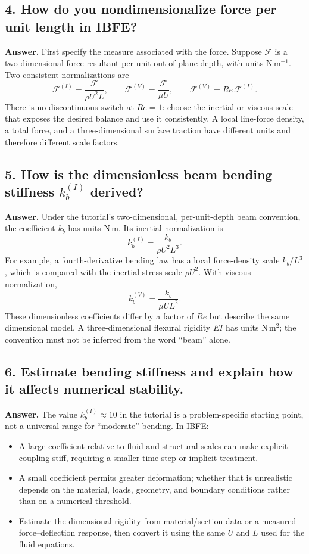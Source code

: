 \documentclass[12pt]{article}
\begin{document}
\subsection*{4. How do you nondimensionalize force per unit length in IBFE?}

\textbf{Answer.}
First specify the measure associated with the force. Suppose $\mathcal{F}$ is a
two-dimensional force resultant per unit out-of-plane depth, with units
$\mathrm{N\,m^{-1}}$. Two consistent normalizations are
\[
\mathcal{F}^{(I)}=\frac{\mathcal{F}}{\rho U^2L},
\qquad
\mathcal{F}^{(V)}=\frac{\mathcal{F}}{\mu U},
\qquad
\mathcal{F}^{(V)}=Re\,\mathcal{F}^{(I)}.
\]
There is no discontinuous switch at $Re=1$: choose the inertial or viscous scale
that exposes the desired balance and use it consistently. A local line-force
density, a total force, and a three-dimensional surface traction have different
units and therefore different scale factors.

\subsection*{5. How is the dimensionless beam bending stiffness $k_b^{(I)}$ derived?}

\textbf{Answer.}
Under the tutorial's two-dimensional, per-unit-depth beam convention, the
coefficient $k_b$ has units $\mathrm{N\,m}$. Its inertial
normalization is
\[
k_b^{(I)}=\frac{k_b}{\rho U^2 L^3}.
\]
For example, a fourth-derivative bending law has a local force-density scale
$k_b/L^3$, which is compared with the inertial stress scale
$\rho U^2$. With viscous normalization,
\[
k_b^{(V)}=\frac{k_b}{\mu U L^2}.
\]
These dimensionless coefficients differ by a factor of $Re$ but describe the
same dimensional model. A three-dimensional flexural rigidity $EI$ has units
$\mathrm{N\,m^2}$; the convention must not be inferred from the word ``beam''
alone.

\subsection*{6. Estimate bending stiffness and explain how it affects numerical stability.}

\textbf{Answer.}
The value $k_b^{(I)}\approx 10$ in the tutorial is a problem-specific
starting point, not a universal range for ``moderate'' bending. In IBFE:
\begin{itemize}
    \item A large coefficient relative to fluid and structural scales can make
          explicit coupling stiff, requiring a smaller time step or implicit
          treatment.
    \item A small coefficient permits greater deformation; whether that is
          unrealistic depends on the material, loads, geometry, and boundary
          conditions rather than on a numerical threshold.
    \item Estimate the dimensional rigidity from material/section data or a
          measured force--deflection response, then convert it using the same
          $U$ and $L$ used for the fluid equations.
\end{itemize}
\end{document}
